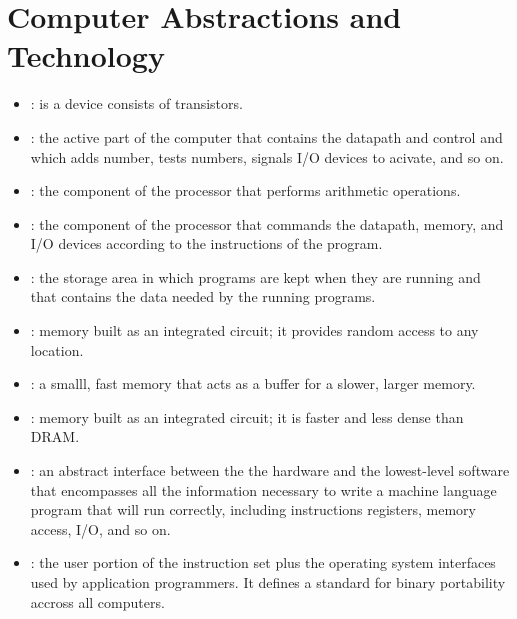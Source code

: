 \chapter{Computer Abstractions and Technology}

  \begin{itemize}
    \item {}: is a device consists of transistors.  
    \item {}: the active part of the
      computer that contains the datapath and control and which adds number,
      tests numbers, signals I/O devices to acivate, and so on.

    \item {}: the component of the processor that performs arithmetic
      operations.

    \item {}: the component of the processor that commands the datapath,
      memory, and I/O devices according to the instructions of the program.

    \item {}: the storage area in which programs are kept when they are
      running and that contains the data needed by the running programs.

    \item {}: memory built as an integrated
      circuit; it provides random access to any location.

    \item {}: a smalll, fast memory that acts as a buffer for
      a slower, larger memory.

    \item {}: memory built as an integrated
      circuit; it is faster and less dense than DRAM.

    \item {}: an abstract interface
      between the the hardware and the lowest-level software that encompasses all
      the information necessary to write a machine language program that will
      run correctly, including instructions registers, memory access, I/O, and
      so on.

    \item {}: the user portion of the
      instruction set plus the operating system interfaces used by application
      programmers. It defines a standard for binary portability accross all
      computers.


\end{itemize}
